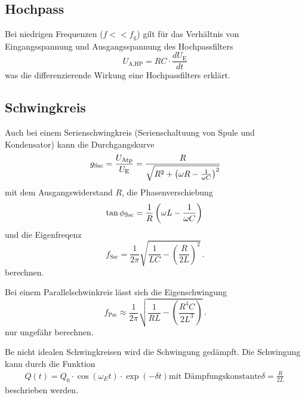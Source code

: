 \documentclass[11pt, a4paper]{article}
\begin{document}
    \subsection{Hochpass}
    Bei niedrigen Frequenzen ($f << f_{\text{g}}$) gilt für das Verhältnis von Eingangsspannung und Ausgangsspannung des Hochpassfilters 
    \begin{equation}
        U_{\text{A,HP}}= RC \cdot \frac{dU_{\text{E}}}{dt} \label{eq:hpdiff}
    \end{equation}
    was die differenzierende Wirkung eine Hochpassfilters erklärt.



    \subsection{Schwingkreis}
    Auch bei einem Serienschwingkreis (Serienschaltuung von Spule und Kondensator) kann die Durchgangskurve
    \begin{equation}
        g_{\text{Ssc}} = \frac{U_{\text{Atp}}}{U_{\text{E}}} = \frac{R}{\sqrt{R^2 + \left( \omega R - \frac{1}{\omega C} \right)^2}} \\
    \end{equation}
    mit dem Ausgangswiderstand $R$, die Phasenverschiebung
    \begin{equation}
        \tan{\phi_{\text{Ssc}}} = \frac{1}{R}\left( \omega L - \frac{1}{\omega C} \right) \\
    \end{equation}
    und die Eigenfreqenz
    \begin{equation}
        f_{\text{Ssc}} = \frac{1}{2 \pi} \sqrt{\frac{1}{L C} - \left(\frac{R}{2L}\right)^2} \,.
    \end{equation}
    berechnen.

    Bei einem Parallelschwinkreis lässt sich die Eigenschwingung
    \begin{equation}
        f_{\text{Psc}} \approx \frac{1}{2 \pi} \sqrt{\frac{1}{R L} - \left(\frac{R^4 C}{2L^3}\right)} \label{eq:koax} \,.
    \end{equation}
    nur ungefähr berechnen.

    Be nicht idealen Schwingkreisen wird die Schwingung gedämpft. Die Schwingung kann durch die Funktion
    \begin{align}
        Q(t) = Q_0 \cdot \cos \left(\omega_E t\right) \cdot \exp \left(-\delta t \right) \label{eq:Q}
        \text{mit Dämpfungskonstante} \delta = \frac{R}{2L} \,
    \end{align}
    beschrieben werden.
\end{document}
